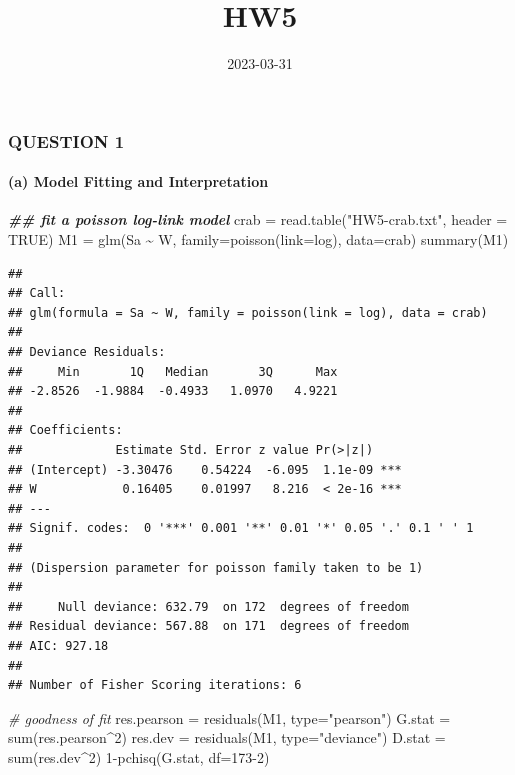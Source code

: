 \documentclass[
]{article}
\title{HW5}
\author{}
\date{\vspace{-2.5em}2023-03-31}
\newenvironment{Shaded}{\begin{snugshade}}{\end{snugshade}}
\newcommand{\AttributeTok}[1]{\textcolor[rgb]{0.77,0.63,0.00}{#1}}
\newcommand{\CommentTok}[1]{\textcolor[rgb]{0.56,0.35,0.01}{\textit{#1}}}
\newcommand{\ConstantTok}[1]{\textcolor[rgb]{0.00,0.00,0.00}{#1}}
\newcommand{\DecValTok}[1]{\textcolor[rgb]{0.00,0.00,0.81}{#1}}
\newcommand{\DocumentationTok}[1]{\textcolor[rgb]{0.56,0.35,0.01}{\textbf{\textit{#1}}}}
\newcommand{\FunctionTok}[1]{\textcolor[rgb]{0.00,0.00,0.00}{#1}}
\newcommand{\NormalTok}[1]{#1}
\newcommand{\OtherTok}[1]{\textcolor[rgb]{0.56,0.35,0.01}{#1}}
\newcommand{\SpecialCharTok}[1]{\textcolor[rgb]{0.00,0.00,0.00}{#1}}
\newcommand{\StringTok}[1]{\textcolor[rgb]{0.31,0.60,0.02}{#1}}
\begin{document}
\maketitle

\hypertarget{question-1}{%
\subsubsection{QUESTION 1}\label{question-1}}

\hypertarget{a-model-fitting-and-interpretation}{%
\paragraph{(a) Model Fitting and
Interpretation}\label{a-model-fitting-and-interpretation}}

\begin{Shaded}
\begin{Highlighting}[]
\DocumentationTok{\#\# fit a poisson log{-}link model}
\NormalTok{crab }\OtherTok{=} \FunctionTok{read.table}\NormalTok{(}\StringTok{"HW5{-}crab.txt"}\NormalTok{, }\AttributeTok{header =} \ConstantTok{TRUE}\NormalTok{)}
\NormalTok{M1 }\OtherTok{=} \FunctionTok{glm}\NormalTok{(Sa }\SpecialCharTok{\textasciitilde{}}\NormalTok{ W, }\AttributeTok{family=}\FunctionTok{poisson}\NormalTok{(}\AttributeTok{link=}\NormalTok{log), }\AttributeTok{data=}\NormalTok{crab)}
\FunctionTok{summary}\NormalTok{(M1)}
\end{Highlighting}
\end{Shaded}

\begin{verbatim}
## 
## Call:
## glm(formula = Sa ~ W, family = poisson(link = log), data = crab)
## 
## Deviance Residuals: 
##     Min       1Q   Median       3Q      Max  
## -2.8526  -1.9884  -0.4933   1.0970   4.9221  
## 
## Coefficients:
##             Estimate Std. Error z value Pr(>|z|)    
## (Intercept) -3.30476    0.54224  -6.095  1.1e-09 ***
## W            0.16405    0.01997   8.216  < 2e-16 ***
## ---
## Signif. codes:  0 '***' 0.001 '**' 0.01 '*' 0.05 '.' 0.1 ' ' 1
## 
## (Dispersion parameter for poisson family taken to be 1)
## 
##     Null deviance: 632.79  on 172  degrees of freedom
## Residual deviance: 567.88  on 171  degrees of freedom
## AIC: 927.18
## 
## Number of Fisher Scoring iterations: 6
\end{verbatim}

\begin{Shaded}
\begin{Highlighting}[]
\CommentTok{\# goodness of fit}
\NormalTok{res.pearson }\OtherTok{=} \FunctionTok{residuals}\NormalTok{(M1, }\AttributeTok{type=}\StringTok{"pearson"}\NormalTok{)}
\NormalTok{G.stat }\OtherTok{=} \FunctionTok{sum}\NormalTok{(res.pearson}\SpecialCharTok{\^{}}\DecValTok{2}\NormalTok{)}
\NormalTok{res.dev }\OtherTok{=} \FunctionTok{residuals}\NormalTok{(M1, }\AttributeTok{type=}\StringTok{"deviance"}\NormalTok{)}
\NormalTok{D.stat }\OtherTok{=} \FunctionTok{sum}\NormalTok{(res.dev}\SpecialCharTok{\^{}}\DecValTok{2}\NormalTok{)}
\DecValTok{1}\SpecialCharTok{{-}}\FunctionTok{pchisq}\NormalTok{(G.stat, }\AttributeTok{df=}\DecValTok{173{-}2}\NormalTok{)}
\end{Highlighting}
\end{Shaded}
\end{document}

